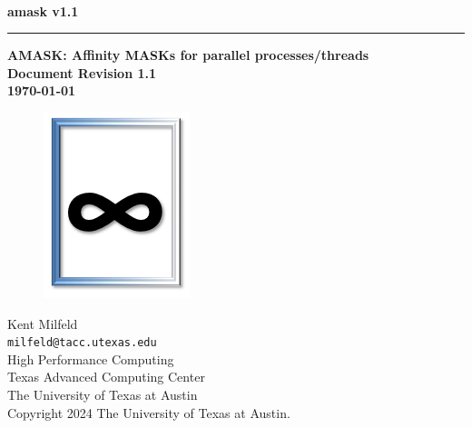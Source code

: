 \documentclass[10pt,a4paper]{report}
\begin{document}
\begin{titlepage}
\thispagestyle{empty}	%
\verb+ +
\vspace{1em}
\begin{flushright}
\huge\bf amask v1.1\\
\rule{\textwidth}{4pt}
\large{\bf AMASK: Affinity MASKs for parallel processes/threads\\
Document Revision 1.1\\
\today}
\end{flushright}
\vfill
\begin{figure}[ht!]
       \centering
        \includegraphics[width=0.5\columnwidth]{images/logo_mask.png}
\end{figure}

\vfill
\begin{flushleft}
Kent Milfeld \\
\verb+milfeld@tacc.utexas.edu+\\
\vspace{0.5em}
High Performance Computing \\
Texas Advanced Computing Center\\
The University of Texas at Austin\\
\vspace{0.5em}
Copyright 2024 The University of Texas at Austin.
\end{flushleft}
\end{titlepage}
\end{document}
